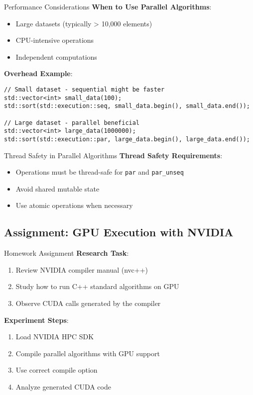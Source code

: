 \begin{frame}[fragile]{Performance Considerations}
	\textbf{When to Use Parallel Algorithms}:
	\begin{itemize}
		\item Large datasets (typically > 10,000 elements)
		\item CPU-intensive operations
		\item Independent computations
	\end{itemize}

	\textbf{Overhead Example}:
	\begin{verbatim}
// Small dataset - sequential might be faster
std::vector<int> small_data(100);
std::sort(std::execution::seq, small_data.begin(), small_data.end());

// Large dataset - parallel beneficial
std::vector<int> large_data(1000000);
std::sort(std::execution::par, large_data.begin(), large_data.end());
	\end{verbatim}
\end{frame}

\begin{frame}{Thread Safety in Parallel Algorithms}
	\textbf{Thread Safety Requirements}:
	\begin{itemize}
		\item Operations must be thread-safe for \texttt{par} and \texttt{par\_unseq}
		\item Avoid shared mutable state
		\item Use atomic operations when necessary
	\end{itemize}
\end{frame}

\subsection{Assignment: GPU Execution with NVIDIA}
\begin{frame}{Homework Assignment}
	\textbf{Research Task}:
	\begin{enumerate}
		\item Review NVIDIA compiler manual (nvc++)
		\item Study how to run C++ standard algorithms on GPU
		\item Observe CUDA calls generated by the compiler
	\end{enumerate}

	\textbf{Experiment Steps}:
	\begin{enumerate}
		\item Load NVIDIA HPC SDK
		\item Compile parallel algorithms with GPU support
		\item Use correct compile option
		\item Analyze generated CUDA code
	\end{enumerate}
\end{frame}

